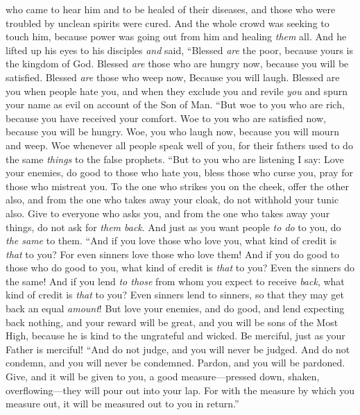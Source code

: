 \begin{biblechapter}
\verse who came to hear him and to be healed of their diseases, and those who were troubled by unclean spirits were cured.
\verse And the whole crowd was seeking to touch him, because power was going out from him and healing \textit{them} all.
\verse And he lifted up his eyes to his disciples \textit{and} said,
\verse “Blessed \textit{are} the poor, 
because yours is the kingdom of God.
\verse Blessed \textit{are} those who are hungry now, 
because you will be satisfied. 
Blessed \textit{are} those who weep now, 
Because you will laugh.
\verse Blessed are you when people hate you, and when they exclude you and revile \textit{you} and spurn your name as evil on account of the Son of Man.
 “But woe to you who are rich, 
because you have received your comfort.
\verse Woe to you who are satisfied now, 
because you will be hungry. 
Woe, you who laugh now, 
because you will mourn and weep.
\verse Woe whenever all people speak well of you, 
for their fathers used to do the same \textit{things} to the false prophets.
 “But to you who are listening I say: Love your enemies, do good to those who hate you,
\verse bless those who curse you, pray for those who mistreat you.
\verse To the one who strikes you on the cheek, offer the other also, and from the one who takes away your cloak, do not withhold your tunic also.
\verse Give to everyone who asks you, and from the one who takes away your things, do not ask for \textit{them back}.
\verse And just as you want people \textit{to do} to you, do \textit{the same} to them.
\verse “And if you love those who love you, what kind of credit is \textit{that} to you? For even sinners love those who love them!
\verse And if you do good to those who do good to you, what kind of credit is \textit{that} to you? Even the sinners do the same!
\verse And if you lend \textit{to those} from whom you expect to receive \textit{back}, what kind of credit is \textit{that} to you? Even sinners lend to sinners, so that they may get back an equal \textit{amount}!
\verse But love your enemies, and do good, and lend expecting back nothing, and your reward will be great, and you will be sons of the Most High, because he is kind to the ungrateful and wicked.
\verse Be merciful, just as your Father is merciful!
 “And do not judge, and you will never be judged. And do not condemn, and you will never be condemned. Pardon, and you will be pardoned.
\verse Give, and it will be given to you, a good measure—pressed down, shaken, overflowing—they will pour out into your lap. For with the measure by which you measure out, it will be measured out to you in return.”

\end{biblechapter}
